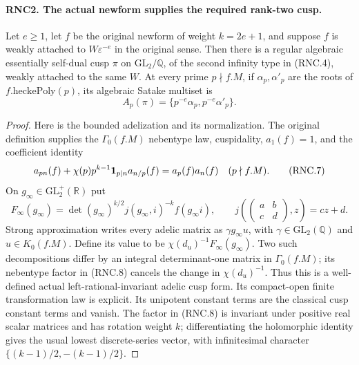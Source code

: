 \documentclass[11pt,a4paper]{article}
\numberwithin{equation}{section}
\theoremstyle{remark}\newtheorem{remark}[theorem]{Remark}
\begin{document}
\paragraph{RNC2. The actual newform supplies the required rank-two cusp.}
\label{claim:RNC2}
Let $e\geq1$, let $f$ be the original newform of weight
$k=2e+1$, and suppose $f$ is weakly attached to
$W\varepsilon^{-e}$ in the original sense.  Then there is a
regular algebraic essentially self-dual cusp $\pi$ on
$\mathrm{GL}_2/\mathbb Q$, of the second infinity type in
(RNC.4), weakly attached to the same $W$.  At every prime
$p\nmid f.M$, if $\alpha_p,\alpha'_p$ are the roots of
$f.\mathrm{heckePoly}(p)$, its algebraic Satake multiset is
\[
           A_p(\pi)=\{p^{-e}\alpha_p,p^{-e}\alpha'_p\}.
                                                               \tag{RNC.6}
\]
\begin{proof}
Here is the bounded adelization and its normalization.  The
original definition supplies the $\Gamma_0(f.M)$ nebentype law,
cuspidality, $a_1(f)=1$, and the coefficient identity
\[
 a_{pn}(f)+\chi(p)p^{k-1}{\bf1}_{p\mid n}a_{n/p}(f)
                         =a_p(f)a_n(f)\quad(p\nmid f.M).
                                                               \tag{RNC.7}
\]
On $g_\infty\in\mathrm{GL}_2^+(\mathbb R)$ put
\[
 F_\infty(g_\infty)=\det(g_\infty)^{k/2}
               j(g_\infty,i)^{-k}f(g_\infty i),
 \qquad j\!\left(\begin{pmatrix}a&b\\c&d\end{pmatrix},z\right)
                     =cz+d.
                                                               \tag{RNC.8}
\]
Strong approximation writes every adelic matrix as
$\gamma g_\infty u$, with $\gamma\in\mathrm{GL}_2(\mathbb Q)$
and $u\in K_0(f.M)$.  Define its value to be
$\chi(d_u)^{-1}F_\infty(g_\infty)$.  Two such decompositions
differ by an integral determinant-one matrix in
$\Gamma_0(f.M)$; its nebentype factor in (RNC.8) cancels the
change in $\chi(d_u)^{-1}$.  Thus this is a well-defined actual
left-rational-invariant adelic cusp form.  Its compact-open
finite transformation law is explicit.  Its unipotent constant
terms are the classical cusp constant terms and vanish.
The factor in (RNC.8) is invariant under positive real scalar
matrices and has rotation weight $k$; differentiating the
holomorphic identity gives the usual lowest discrete-series
vector, with infinitesimal character
$\{(k-1)/2,-(k-1)/2\}$.


\end{proof}
\end{document}
